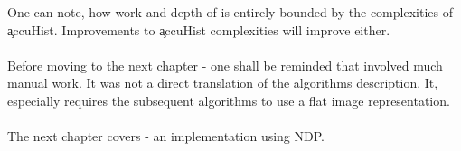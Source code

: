   One can note, how work and depth of \man is entirely bounded
  by the complexities of \c{accuHist}. Improvements to \c{accuHist}
  complexities will improve \man either.
  
  \paragraph{}
  Before moving to the next chapter - one shall be reminded that
  \man involved much manual work. It was not a direct translation
  of the algorithms description. It, especially requires
  the subsequent algorithms to use a flat image representation.
  
  \paragraph{}
  The next chapter covers \ndpn - an implementation using NDP.
  
  
  
  
